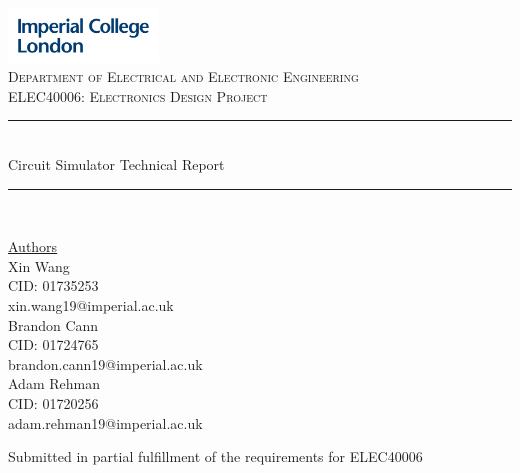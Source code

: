 \documentclass[12pt,a4paper]{article}
\begin{document}
\begin{titlepage}
	\newcommand{\HRule}{\rule{\linewidth}{0.5mm}}
    \includegraphics[width = 4cm]{./Images/Logo.jpg}\\[0.5cm] 
    
    \center 
	\textsc{\large Department of Electrical and Electronic Engineering }\\[0.5cm] 
	\textsc{\normalsize ELEC40006: Electronics Design Project}\\[0.5cm] 
    
	\HRule \\[0.4cm]
	Circuit Simulator Technical Report
    \HRule \\[1.5cm]
     
    \begin{center}
		\underline{Authors}\\[0.5cm] Xin Wang\\CID: 01735253\\xin.wang19@imperial.ac.uk \\[0.5cm]
		Brandon Cann\\ CID: 01724765\\ brandon.cann19@imperial.ac.uk\\[0.5cm]
		Adam Rehman\\ CID: 01720256\\adam.rehman19@imperial.ac.uk\\[0.5cm]
	\end{center} \large
    
    \vfill %
 	\small Submitted in partial fulfillment of the requirements for ELEC40006 \\ [0.5cm]
    \makeatletter
    \@date 
    \makeatother
\end{titlepage}

\tableofcontents
\pagebreak
\end{document}
